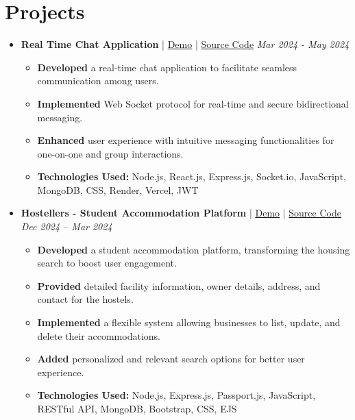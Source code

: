 \documentclass[a4paper,11pt]{article}
\begin{document}
\section*{Projects}
\begin{itemize}[leftmargin=*]
    \item \textbf{Real Time Chat Application} | \hspace{0.3em} \href{https://real-time-chat-app-git-main-kaushal-rathours-projects-b9acca1e.vercel.app}{Demo}  |  \href{https://github.com/kaushalrathour/Real-Time-Chat-App}{Source Code} \hfill \textit{Mar 2024 - May 2024} \\
    
    \begin{itemize}[leftmargin=5mm]
      \item \textbf{Developed} a real-time chat application to facilitate seamless communication among users.
      \item \textbf{Implemented} Web Socket protocol for real-time and secure bidirectional messaging.
      \item \textbf{Enhanced} user experience with intuitive messaging functionalities for one-on-one and group interactions.
      \item \textbf{Technologies Used:} Node.js, React.js, Express.js, Socket.io, JavaScript, MongoDB, CSS, Render, Vercel, JWT
    \end{itemize}

    \item \textbf{Hostellers - Student Accommodation Platform} | \hspace{0.3em} \href{https://hostellers.onrender.com/}{Demo}  |  \href{https://github.com/kaushalrathour/Hostellers}{Source Code} \hfill \textit{Dec 2024 – Mar 2024} \\
    \begin{itemize}[leftmargin=5mm]
        \item \textbf{Developed} a student accommodation platform, transforming the housing search to boost user engagement.
        \item \textbf{Provided} detailed facility information, owner details, address, and contact for the hostels.
        \item \textbf{Implemented} a flexible system allowing businesses to list, update, and delete their accommodations.
        \item \textbf{Added} personalized and relevant search options for better user experience.
        \item \textbf{Technologies Used:} Node.js, Express.js, Passport.js, JavaScript, RESTful API, MongoDB, Bootstrap, CSS, EJS
    \end{itemize}
\end{itemize}
\end{document}
